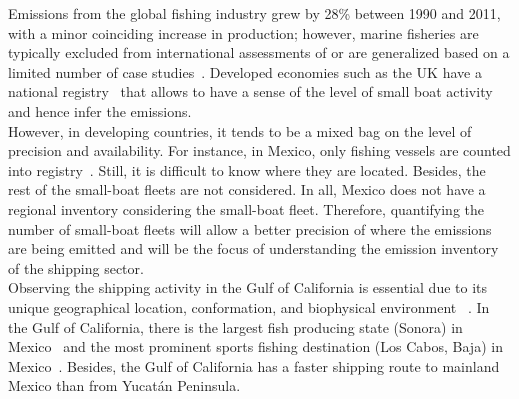Emissions from the global fishing industry grew by 28\% between 1990 and 2011, with a minor coinciding increase in production; however, marine fisheries are typically excluded from international assessments of  or are generalized based on a limited number of case studies~\cite{parker2018fuel}. Developed economies such as the UK have a national registry~\cite{uk2021registration} that allows to have a sense of the level of small boat activity and hence infer the  emissions.\\

However, in developing countries, it tends to be a mixed bag on the level of precision and availability. For instance, in Mexico, only fishing vessels are counted into registry~\cite{Mexico2021RegisteredVessels}. Still, it is difficult to know where they are located. Besides, the rest of the small-boat fleets are not considered. In all, Mexico does not have a regional  inventory considering the small-boat fleet. Therefore, quantifying the number of small-boat fleets will allow a better precision of where the emissions are being emitted and will be the focus of understanding the emission inventory of the shipping sector.\\


Observing the shipping activity in the Gulf of California is essential due to its unique geographical location, conformation, and biophysical environment ~\cite{LLUCHCOTA20071, munguia2018ecological, MARINONE2012133}. In the Gulf of California, there is the largest fish producing state (Sonora) in Mexico~\cite{MELTZER2006222} and the most prominent sports fishing destination (Los Cabos, Baja) in Mexico~\cite{hernandez2012economic}. Besides, the Gulf of California has a faster shipping route to mainland Mexico than from Yucatán Peninsula.\\






